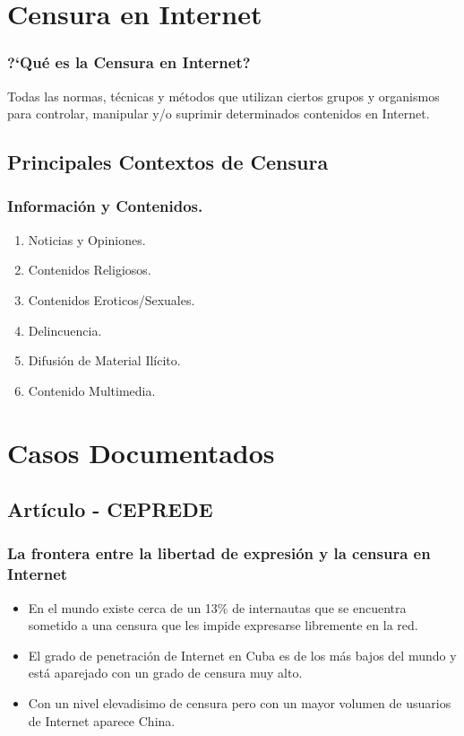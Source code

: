 \documentclass{beamer}
\begin{document}
\section{Censura en Internet}
\frame
{
\transdissolve[duration=0.2]
\frametitle{?`Qu\'e es la Censura en Internet?}
Todas las normas, t\'ecnicas y m\'etodos que utilizan ciertos grupos y organismos para controlar, manipular y/o suprimir determinados contenidos en Internet.
}

\subsection{Principales Contextos de Censura}
\frame
{
\transdissolve[duration=0.2]
\frametitle{Informaci\'on y Contenidos.}
\begin{enumerate}
\item Noticias y Opiniones.
\item Contenidos Religiosos.
\item Contenidos Eroticos/Sexuales.
\item Delincuencia.
\item Difusi\'on de Material Il\'icito.
\item Contenido Multimedia.
\end{enumerate}
}

\section{Casos Documentados}
\subsection{Art\'iculo - CEPREDE}
\frame
{
\transdissolve[duration=0.2]
\frametitle{La frontera entre la libertad de expresi\'on y la censura en Internet}
\begin{itemize}
\item En el mundo existe cerca de un 13\% de internautas que se encuentra sometido a una censura que les impide expresarse libremente en la red.
\item El grado de penetraci\'on de Internet en Cuba es de los m\'as bajos del mundo y est\'a aparejado con un grado de censura muy alto.
\item Con un nivel elevadisimo de censura pero con un mayor volumen de usuarios de Internet aparece China.
\end{itemize}
}
\end{document}
